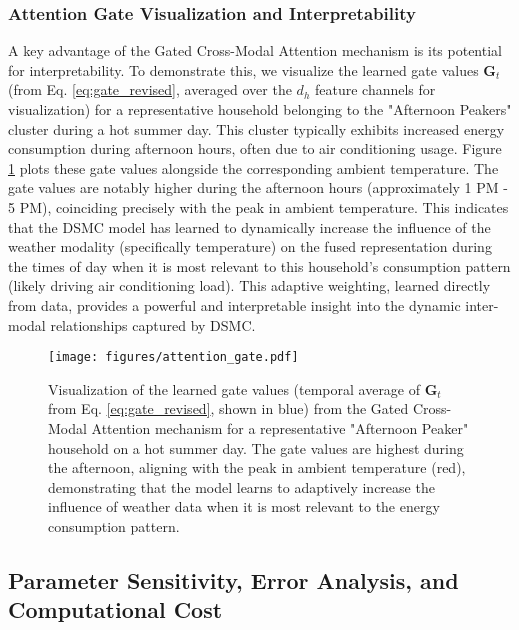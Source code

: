\documentclass[journal]{IEEEtran}
\begin{document}
\subsubsection{Attention Gate Visualization and Interpretability}
A key advantage of the Gated Cross-Modal Attention mechanism is its potential for interpretability. To demonstrate this, we visualize the learned gate values $\mathbf{G}_t$ (from Eq. \ref{eq:gate_revised}, averaged over the $d_h$ feature channels for visualization) for a representative household belonging to the "Afternoon Peakers" cluster during a hot summer day. This cluster typically exhibits increased energy consumption during afternoon hours, often due to air conditioning usage. Figure \ref{fig:attention} plots these gate values alongside the corresponding ambient temperature. The gate values are notably higher during the afternoon hours (approximately 1 PM - 5 PM), coinciding precisely with the peak in ambient temperature. This indicates that the DSMC model has learned to dynamically increase the influence of the weather modality (specifically temperature) on the fused representation during the times of day when it is most relevant to this household's consumption pattern (likely driving air conditioning load). This adaptive weighting, learned directly from data, provides a powerful and interpretable insight into the dynamic inter-modal relationships captured by DSMC.

\begin{figure}[h!]
\centering
\texttt{[image: figures/attention\_gate.pdf]} %
\caption{Visualization of the learned gate values (temporal average of $\mathbf{G}_t$ from Eq. \ref{eq:gate_revised}, shown in blue) from the Gated Cross-Modal Attention mechanism for a representative "Afternoon Peaker" household on a hot summer day. The gate values are highest during the afternoon, aligning with the peak in ambient temperature (red), demonstrating that the model learns to adaptively increase the influence of weather data when it is most relevant to the energy consumption pattern.}
\label{fig:attention}
\end{figure}

\subsection{Parameter Sensitivity, Error Analysis, and Computational Cost}
\end{document}
